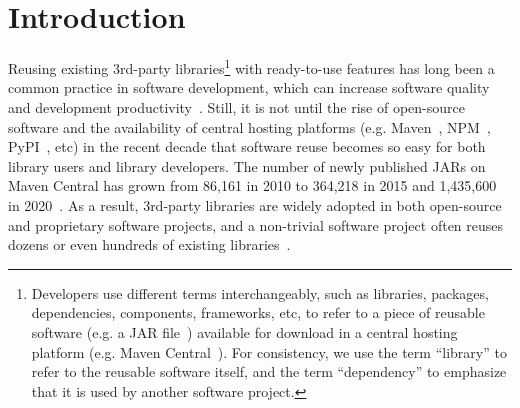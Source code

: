 \documentclass[sigconf, screen]{acmart}
\begin{document}


\maketitle

\section{Introduction}

Reusing existing 3rd-party libraries\footnote{
Developers use different terms interchangeably, such as libraries, packages, dependencies, components, frameworks, etc, to refer to a piece of reusable software (e.g. a JAR file~\cite{JAR}) available for download in a central hosting platform (e.g. Maven Central~\cite{Maven}). 
For consistency, we use the term ``library'' to refer to the reusable software itself, and the term ``dependency'' to emphasize that it is used by another software project.
} with ready-to-use features has long been a 
common practice in software development, which can increase software quality and development productivity~\cite{mohagheghi2007quality}.
Still, it is not until the rise of open-source software and the availability of central hosting platforms (e.g. Maven~\cite{Maven}, NPM~\cite{NPM}, PyPI~\cite{PyPI}, etc) in the recent decade that software reuse becomes so easy for both library users and library developers.
The number of newly published JARs on Maven Central has grown from 86,161 in 2010 to 364,218 in 2015 and 1,435,600 in 2020~\cite{Maven}.
As a result, 3rd-party libraries are widely adopted in both open-source and proprietary software projects, and a non-trivial software project often reuses dozens or even hundreds of existing libraries~\cite{thung2013automated, wang2020empirical}.

\end{document}

